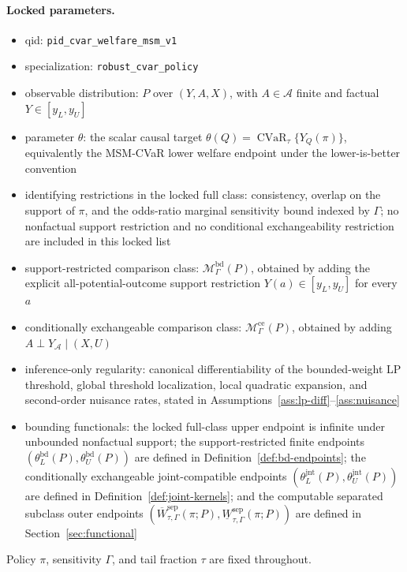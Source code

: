 \documentclass[11pt]{article}
\theoremstyle{definition}
\theoremstyle{plain}
\theoremstyle{remark}
\begin{document}
\paragraph{Locked parameters.}
\begin{itemize}
  \item qid: \texttt{pid\_cvar\_welfare\_msm\_v1}
  \item specialization: \texttt{robust\_cvar\_policy}
  \item observable distribution: \(P\) over \((Y,A,X)\), with
    \(A\in\mathcal A\) finite and factual \(Y\in[y_L,y_U]\)
  \item parameter \(\theta\): the scalar causal target
    \(\theta(Q)=\operatorname{CVaR}_{\tau}\{Y_Q(\pi)\}\), equivalently the
    MSM-CVaR lower welfare endpoint under the lower-is-better convention
  \item identifying restrictions in the locked full class:
    consistency, overlap on the support of \(\pi\), and the odds-ratio marginal
    sensitivity bound indexed by \(\Gamma\); no nonfactual support restriction
    and no conditional exchangeability restriction are included in this locked
    list
  \item support-restricted comparison class:
    \(\mathcal M_\Gamma^{\mathrm{bd}}(P)\), obtained by adding the explicit
    all-potential-outcome support restriction
    \(Y(a)\in[y_L,y_U]\) for every \(a\)
  \item conditionally exchangeable comparison class:
    \(\mathcal M_\Gamma^{\mathrm{ce}}(P)\), obtained by adding
    \(A\perp Y_{\mathcal A}\mid (X,U)\)
  \item inference-only regularity:
    canonical differentiability of the bounded-weight LP threshold, global
    threshold localization, local quadratic expansion, and second-order
    nuisance rates, stated in Assumptions~\ref{ass:lp-diff}--\ref{ass:nuisance}
  \item bounding functionals:
    the locked full-class upper endpoint is infinite under unbounded
    nonfactual support; the support-restricted finite endpoints
    \((\theta_L^{\mathrm{bd}}(P),\theta_U^{\mathrm{bd}}(P))\) are defined in
    Definition~\ref{def:bd-endpoints}; the conditionally exchangeable
    joint-compatible endpoints
    \((\theta_L^{\mathrm{jnt}}(P),\theta_U^{\mathrm{jnt}}(P))\) are defined in
    Definition~\ref{def:joint-kernels}; and the computable separated subclass
    outer endpoints
    \((\overline W_{\tau,\Gamma}^{\mathrm{sep}}(\pi;P),
      \underline W_{\tau,\Gamma}^{\mathrm{sep}}(\pi;P))\) are defined in
    Section~\ref{sec:functional}
\end{itemize}
Policy \(\pi\), sensitivity \(\Gamma\), and tail fraction \(\tau\) are fixed
throughout.
\end{document}
